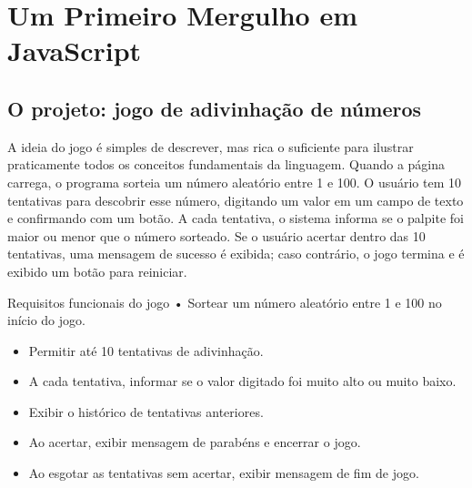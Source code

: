 \chapter{Um Primeiro Mergulho em JavaScript}

\section{O projeto: jogo de adivinhação de números}

A ideia do jogo é simples de descrever, mas rica o suficiente para ilustrar praticamente todos os conceitos fundamentais da linguagem. Quando a página carrega, o programa sorteia um número aleatório entre 1 e 100. O usuário tem 10 tentativas para descobrir esse número, digitando um valor em um campo de texto e confirmando com um botão. A cada tentativa, o sistema informa se o palpite foi maior ou menor que o número sorteado. Se o usuário acertar dentro das 10 tentativas, uma mensagem de sucesso é exibida; caso contrário, o jogo termina e é exibido um botão para reiniciar.

\begin{infobox}{Requisitos funcionais do jogo}
• Sortear um número aleatório entre 1 e 100 no início do jogo.
\end{infobox}

\begin{itemize}
  \item Permitir até 10 tentativas de adivinhação.
\end{itemize}

\begin{itemize}
  \item A cada tentativa, informar se o valor digitado foi muito alto ou muito baixo.
\end{itemize}

\begin{itemize}
  \item Exibir o histórico de tentativas anteriores.
\end{itemize}

\begin{itemize}
  \item Ao acertar, exibir mensagem de parabéns e encerrar o jogo.
\end{itemize}

\begin{itemize}
  \item Ao esgotar as tentativas sem acertar, exibir mensagem de fim de jogo.
\end{itemize}

